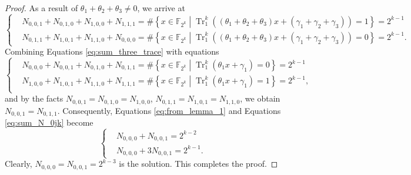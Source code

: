 \documentclass{article}
\newcommand{\F}{\mathbb{F}}
\newcommand{\0}{\textbf{0}}
\newcommand{\1}{\textbf{1}}
\newcommand{\TRACE}{\operatorname{Tr}_1^k}
\theoremstyle{plain}
\begin{document}
\begin{proof}
        As a result of $\theta_1+\theta_2+\theta_3\ne 0$, we arrive at  
        \begin{equation}\label{eq:sum_three_trace} \left\{\begin{alignedat}{2}
            &N_{0,0,1}+N_{0,1,0}+N_{1,0,0}+N_{1,1,1}=\#\left\{x\in\F_{2^k}\middle|\TRACE\left(\left(\theta_1+\theta_2+\theta_3\right)x+\left(\gamma_1+\gamma_2+\gamma_3\right)\right)=1\right\}=2^{k-1}\\
            &N_{0,1,1}+N_{1,0,1}+N_{1,1,0}+N_{0,0,0}=\#\left\{x\in\F_{2^k}\middle|\TRACE\left(\left(\theta_1+\theta_2+\theta_3\right)x+\left(\gamma_1+\gamma_2+\gamma_3\right)\right)=0\right\}=2^{k-1}.
        \end{alignedat}\right.\end{equation}
        Combining Equations \eqref{eq:sum_three_trace} with  equations  
        \begin{equation}\label{eq:sum_N_0jk}\left\{\begin{alignedat}{2}
            &N_{0,0,0}+N_{0,0,1}+N_{0,1,0}+N_{0,1,1}=\#\left\{x\in\F_{2^k}\middle|\TRACE\left(\theta_1x+\gamma_1\right)=0\right\}=2^{k-1}\\
            &N_{1,0,0}+N_{1,0,1}+N_{1,1,0}+N_{1,1,1}=\#\left\{x\in\F_{2^k}\middle|\TRACE\left(\theta_1x+\gamma_1\right)=1\right\}=2^{k-1},\\
        \end{alignedat}\right.\end{equation}
        and by the facts $N_{0,0,1}=N_{0,1,0}=N_{1,0,0}$, $N_{0,1,1}=N_{1,0,1}=N_{1,1,0}$, we obtain $N_{0,0,1}=N_{0,1,1}$. 
        Consequently, Equations \eqref{eq:from_lemma_1} and Equations \eqref{eq:sum_N_0jk} become  
        \begin{equation*}\left\{\begin{alignedat}{2}
            &N_{0,0,0}+N_{0,0,1}=2^{k-2}\\
            &N_{0,0,0}+3N_{0,0,1}=2^{k-1}.
        \end{alignedat}\right.\end{equation*}
        Clearly, $N_{0,0,0}=N_{0,0,1}=2^{k-3}$ is the solution. This completes the proof.
    \end{proof}
\end{document}
